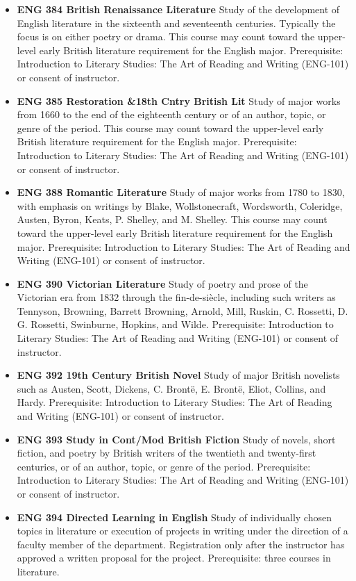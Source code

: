 \documentclass[
  letterpaper,
]{scrbook}
\begin{document}
\begin{itemize}
\item
  \textbf{ENG 384 British Renaissance Literature} Study of the
  development of English literature in the sixteenth and seventeenth
  centuries. Typically the focus is on either poetry or drama. This
  course may count toward the upper-level early British literature
  requirement for the English major. Prerequisite: Introduction to
  Literary Studies: The Art of Reading and Writing (ENG-101) or consent
  of instructor.\\
\item
  \textbf{ENG 385 Restoration \&18th Cntry British Lit} Study of major
  works from 1660 to the end of the eighteenth century or of an author,
  topic, or genre of the period. This course may count toward the
  upper-level early British literature requirement for the English
  major. Prerequisite: Introduction to Literary Studies: The Art of
  Reading and Writing (ENG-101) or consent of instructor.\\
\item
  \textbf{ENG 388 Romantic Literature} Study of major works from 1780 to
  1830, with emphasis on writings by Blake, Wollstonecraft, Wordsworth,
  Coleridge, Austen, Byron, Keats, P. Shelley, and M. Shelley. This
  course may count toward the upper-level early British literature
  requirement for the English major. Prerequisite: Introduction to
  Literary Studies: The Art of Reading and Writing (ENG-101) or consent
  of instructor.\\
\item
  \textbf{ENG 390 Victorian Literature} Study of poetry and prose of the
  Victorian era from 1832 through the fin-de-siècle, including such
  writers as Tennyson, Browning, Barrett Browning, Arnold, Mill, Ruskin,
  C. Rossetti, D. G. Rossetti, Swinburne, Hopkins, and Wilde.
  Prerequisite: Introduction to Literary Studies: The Art of Reading and
  Writing (ENG-101) or consent of instructor.\\
\item
  \textbf{ENG 392 19th Century British Novel} Study of major British
  novelists such as Austen, Scott, Dickens, C. Brontë, E. Brontë, Eliot,
  Collins, and Hardy. Prerequisite: Introduction to Literary Studies:
  The Art of Reading and Writing (ENG-101) or consent of instructor.\\
\item
  \textbf{ENG 393 Study in Cont/Mod British Fiction} Study of novels,
  short fiction, and poetry by British writers of the twentieth and
  twenty-first centuries, or of an author, topic, or genre of the
  period. Prerequisite: Introduction to Literary Studies: The Art of
  Reading and Writing (ENG-101) or consent of instructor.\\
\item
  \textbf{ENG 394 Directed Learning in English} Study of individually
  chosen topics in literature or execution of projects in writing under
  the direction of a faculty member of the department. Registration only
  after the instructor has approved a written proposal for the project.
  Prerequisite: three courses in literature.
\end{itemize}
\end{document}
